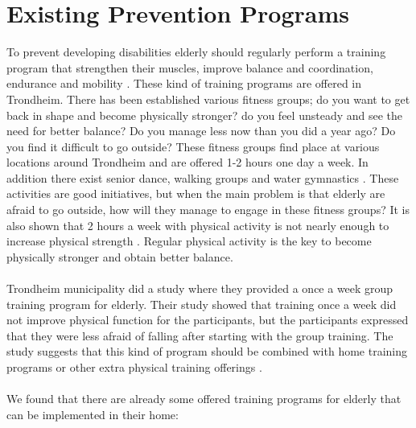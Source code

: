 \section{Existing Prevention Programs}
To prevent developing disabilities elderly should regularly perform a training program that strengthen their muscles, improve balance and coordination, endurance and mobility \cite{gruppetrening-trheim}. These kind of training programs are offered in Trondheim. There has been established various fitness groups; do you want to get back in shape and become physically stronger? do you feel unsteady and see the need for better balance? Do you manage less now than you did a year ago? Do you find it difficult to go outside? These fitness groups find place at various locations around Trondheim and are offered 1-2 hours one day a week. In addition there exist senior dance, walking groups and water gymnastics \cite{trim}. These activities are good initiatives, but when the main problem is that elderly are afraid to go outside, how will they manage to engage in these fitness groups? It is also shown that 2 hours a week with physical activity is not nearly enough to increase physical strength \cite{gruppetrening-trheim}. Regular physical activity is the key to become physically stronger and obtain better balance. \\ \\
Trondheim municipality did a study where they provided a once a week group training program for elderly. Their study showed that training once a week did not improve physical function for the participants, but the participants expressed that they were less afraid of falling after starting with the group training. The study suggests that this kind of program should be combined with home training programs or other extra physical training offerings \cite{gruppetrening-trheim}. \\ \\
We found that there are already some offered training programs for elderly that can be implemented in their home:\\ \\
